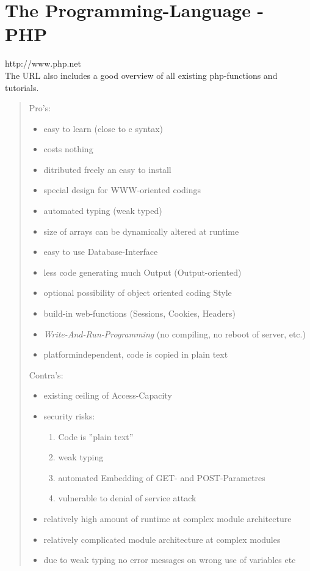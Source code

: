 \documentclass{article}
\begin{document}
\section{The Programming-Language - PHP}
http://www.php.net\\
The URL also includes a good overview of all existing php-functions and tutorials.
\begin{quote}
  Pro's:
  \begin{itemize}
    \item easy to learn (close to c syntax)
	\item costs nothing
	\item ditributed freely an easy to install
	\item special design for WWW-oriented codings
	\item automated typing (weak typed)
	\item size of arrays can be dynamically altered at runtime
	\item easy to use Database-Interface
	\item less code generating much Output (Output-oriented)
	\item optional possibility of object oriented coding Style
	\item build-in web-functions (Sessions, Cookies, Headers)
	\item \emph{Write-And-Run-Programming} (no compiling, no reboot of server, etc.)
	\item platformindependent, code is copied in plain text
  \end{itemize}
  Contra's:
  \begin{itemize}
	\item existing ceiling of Access-Capacity
	\item security risks:
	\begin{enumerate}
	  \item Code is ''plain text''
	  \item weak typing
	  \item automated Embedding of GET- and POST-Parametres 
	  \item vulnerable to denial of service attack
	\end{enumerate}
	\item relatively high amount of runtime at complex module architecture
	\item relatively complicated module architecture at complex modules
	\item due to weak typing no error messages on wrong use of variables etc
  \end{itemize}
\end{quote}
\end{document}
